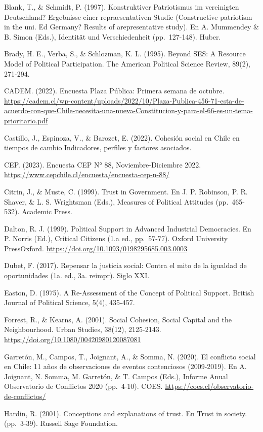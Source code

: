 \documentclass[
  12pt,
]{book}
\begin{document}
Blank, T., \& Schmidt, P. (1997). Konstruktiver Patriotismus im vereinigten Deutschland? Ergebnisse einer repraesentativen Studie (Constructive patriotism in the uni. Ed Germany? Results of arepresentative study). En A. Mummendey \& B. Simon (Eds.), Identität und Verschiedenheit (pp.~127-148). Huber.

Brady, H. E., Verba, S., \& Schlozman, K. L. (1995). Beyond SES: A Resource Model of Political Participation. The American Political Science Review, 89(2), 271-294.

CADEM. (2022). Encuesta Plaza Pública: Primera semana de octubre. \url{https://cadem.cl/wp-content/uploads/2022/10/Plaza-Publica-456-71-esta-de-acuerdo-con-que-Chile-necesita-una-nueva-Constitucion-y-para-el-66-es-un-tema-prioritario.pdf}

Castillo, J., Espinoza, V., \& Barozet, E. (2022). Cohesión social en Chile en tiempos de cambio Indicadores, perfiles y factores asociados.

CEP. (2023). Encuesta CEP N° 88, Noviembre-Diciembre 2022. \url{https://www.cepchile.cl/encuesta/encuesta-cep-n-88/}

Citrin, J., \& Muste, C. (1999). Trust in Government. En J. P. Robinson, P. R. Shaver, \& L. S. Wrightsman (Eds.), Measures of Political Attitudes (pp.~465-532). Academic Press.

Dalton, R. J. (1999). Political Support in Advanced Industrial Democracies. En P. Norris (Ed.), Critical Citizens (1.a ed., pp.~57-77). Oxford University PressOxford. \url{https://doi.org/10.1093/0198295685.003.0003}

Dubet, F. (2017). Repensar la justicia social: Contra el mito de la igualdad de oportunidades (1a. ed., 3a. reimpr). Siglo XXI.

Easton, D. (1975). A Re-Assessment of the Concept of Political Support. British Journal of Political Science, 5(4), 435-457.

Forrest, R., \& Kearns, A. (2001). Social Cohesion, Social Capital and the Neighbourhood. Urban Studies, 38(12), 2125-2143. \url{https://doi.org/10.1080/00420980120087081}

Garretón, M., Campos, T., Joignant, A., \& Somma, N. (2020). El conflicto social en Chile: 11 años de observaciones de eventos contenciosos (2009-2019). En A. Joignant, N. Somma, M. Garretón, \& T. Campos (Eds.), Informe Anual Observatorio de Conflictos 2020 (pp.~4-10). COES. \url{https://coes.cl/observatorio-de-conflictos/}

Hardin, R. (2001). Conceptions and explanations of trust. En Trust in society. (pp.~3-39). Russell Sage Foundation.
\end{document}
